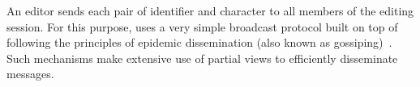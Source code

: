 %   


An editor sends each pair of identifier and character to all members of the
editing session. For this purpose, \CRATE uses a very simple broadcast protocol
built on top of \SPRAY following the principles of epidemic dissemination (also
known as gossiping)~\cite{demers1987epidemic}. Such mechanisms make extensive
use of partial views to efficiently disseminate messages.




